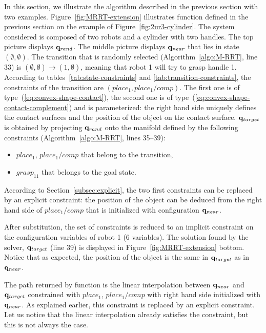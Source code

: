 In this section, we illustrate the algorithm described in the previous section with two examples. Figure~\ref{fig:MRRT-extension} illustrates function \EXTEND defined in the previous section on the example of Figure~\ref{fig:2ur3-cylinder}.
The system considered is
composed of two robots and a cylinder with two handles. The top picture displays
$\mathbf{q}_{rand}$. The middle picture displays $\mathbf{q}_{near}$ that lies in state
$(\emptyset,\emptyset)$. The transition that is randomly selected
(Algorithm~\ref{algo:M-RRT}, line 33) is
$(\emptyset,\emptyset) \rightarrow (1,\emptyset)$, meaning that robot 1 will
try to grasp handle 1. According to tables~\ref{tab:state-constraints} and
\ref{tab:transition-constraints}, the constraints of the transition are
$(place_1, place_1/comp)$.
The first one is of type~(\ref{eq:convex-shape-contact}), the second one is
of type~(\ref{eq:convex-shape-contact-complement}) and is parameterized: the
right hand side uniquely defines the contact surfaces and the position of the
object on the contact surface. $\mathbf{q}_{target}$ is obtained by projecting $\mathbf{q}_{rand}$
onto the manifold defined by the following constraints
(Algorithm~\ref{algo:M-RRT}, lines 35--39):
\begin{itemize}
\item $place_1$, $place_1/comp$ that belong to the transition,
\item $grasp_{11}$ that belongs to the goal state.
\end{itemize}
According to Section~\ref{subsec:explicit}, the two first constraints can be
replaced by an explicit constraint: the position of the object can be deduced
from the right hand side of $place_1/comp$ that is initialized with configuration
$\mathbf{q}_{near}$.

After substitution, the set of constraints is reduced to an implicit constraint
on the configuration variables of robot 1 (6 variables). The solution found by the solver, $\mathbf{q}_{target}$ (line 39) is displayed in
Figure~\ref{fig:MRRT-extension} bottom. Notice that as expected, the position of the object is the same in $\mathbf{q}_{target}$ as in $\mathbf{q}_{near}$.

The path returned by function \EXTEND is the linear interpolation between
$\mathbf{q}_{near}$ and $\mathbf{q}_{target}$ constrained with $place_1$, $place_1/comp$ with
right hand side initialized with $\mathbf{q}_{near}$. As explained earlier, this
constraint is replaced by an explicit constraint. Let us notice that the linear interpolation already satisfies the constraint, but this is not always the case.

